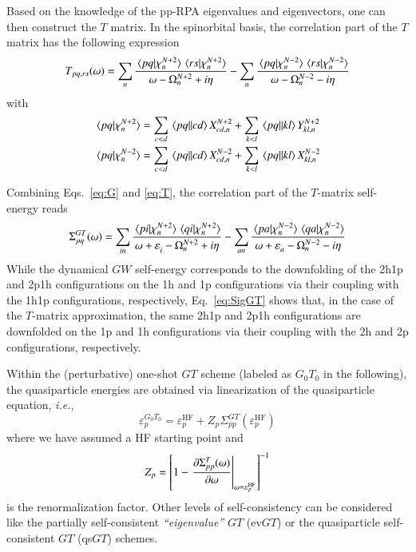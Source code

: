 \documentclass[aip,jcp,reprint,noshowkeys,superscriptaddress]{revtex4-1}
\newcommand{\ie}{\textit{i.e.}}
\newcommand{\HF}{\text{HF}}
\newcommand{\e}[2]{\eps_{#1}^{#2}}
\newcommand{\Om}[2]{\Omega_{#1}^{#2}}
\newcommand{\eps}{\varepsilon}
\begin{document}
Based on the knowledge of the pp-RPA eigenvalues and eigenvectors, one can then construct the $T$ matrix.
In the spinorbital basis, the correlation part of the $T$ matrix has the following expression \cite{Zhang_2016}
\begin{equation}
\label{eq:T}
	T_{pq,rs}(\omega) 
		= \sum_{n} \frac{\braket*{pq}{\chi_n^{N+2}}\braket*{rs}{\chi_n^{N+2}}}{\omega - \Om{n}{N+2} + i\eta}
		- \sum_{n} \frac{\braket*{pq}{\chi_n^{N-2}}\braket*{rs}{\chi_n^{N-2}}}{\omega - \Om{n}{N-2} - i\eta}
\end{equation}
with
\begin{subequations}
\begin{align}
	\braket*{pq}{\chi_n^{N+2}} & = \sum_{c < d} \mel{pq}{}{cd} X_{cd,n}^{N+2} + \sum_{k < l}  \mel{pq}{}{kl} Y_{kl,n}^{N+2}
	\\
	\braket*{pq}{\chi_n^{N-2}} & = \sum_{c < d} \mel{pq}{}{cd} X_{cd,n}^{N-2} + \sum_{k < l}  \mel{pq}{}{kl} X_{kl,n}^{N-2}
\end{align}
\end{subequations}

Combining Eqs.~\eqref{eq:G} and \eqref{eq:T}, the correlation part of the $T$-matrix self-energy reads \cite{Romaniello_2012,Martin_2016,Zhang_2017,Li_2021b}
\begin{equation}
\label{eq:SigGT}
	\Sigma^{GT}_{pq}(\omega)
	= \sum_{in} \frac{\braket*{pi}{\chi_n^{N+2}}\braket*{qi}{\chi_n^{N+2}}}{\omega + \e{i}{} - \Om{n}{N+2} + i\eta}
	- \sum_{an} \frac{\braket*{pa}{\chi_n^{N-2}}\braket*{qa}{\chi_n^{N-2}}}{\omega + \e{a}{} - \Om{n}{N-2} - i\eta}
\end{equation}
While the dynamical $GW$ self-energy corresponds to the downfolding of the 2h1p and 2p1h configurations on the 1h and 1p configurations via their coupling with the 1h1p configurations, respectively, \cite{Bintrim_2021a} Eq.~\eqref{eq:SigGT} shows that, in the case of the $T$-matrix approximation, the same 2h1p and 2p1h configurations are downfolded on the 1p and 1h configurations via their coupling with the 2h and 2p configurations, respectively.

Within the (perturbative) one-shot $GT$ scheme (labeled as $G_0T_0$ in the following), the quasiparticle energies are obtained via linearization of the quasiparticle equation, \cite{Strinati_1980,Hybertsen_1985a,Hybertsen_1986,Godby_1988,Linden_1988,Northrup_1991,Blase_1994,Rohlfing_1995,Shishkin_2007} \ie,
\begin{equation}
\label{eq:G0T0}
	\e{p}{G_0T_0} = \e{p}{\HF} + Z_p \Sigma^{GT}_{pp}(\e{p}{\HF})
\end{equation}
where we have assumed a HF starting point and
\begin{equation}
	Z_p = \qty[ 1 - \eval{\pdv{\Sigma^{T}_{pp}(\omega)}{\omega}}_{\omega = \e{p}{\HF}} ]^{-1}
\end{equation}
is the renormalization factor.
Other levels of self-consistency can be considered like the partially self-consistent \textit{``eigenvalue''} $GT$ (ev$GT$)  \cite{Hybertsen_1986,Shishkin_2007,Blase_2011,Faber_2011,Rangel_2016,Gui_2018} or the quasiparticle self-consistent $GT$ (qs$GT$) \cite{Faleev_2004,vanSchilfgaarde_2006,Kotani_2007,Ke_2011,Kaplan_2016} schemes.
\end{document}

